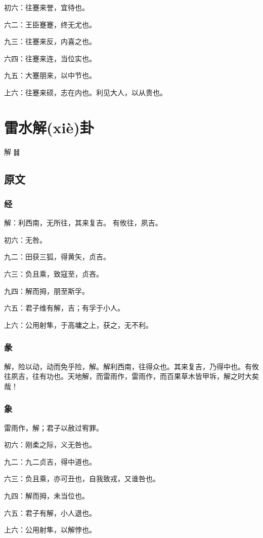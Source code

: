 \documentclass[12pt,oneside]{book}
\begin{document}
初六：往蹇来誉，宜待也。

六二：王臣蹇蹇，终无尤也。

九三：往蹇来反，内喜之也。

六四：往蹇来连，当位实也。

九五：大蹇朋来，以中节也。

上六：往蹇来硕，志在内也。利见大人，以从贵也。

\chapter{雷水解(xiè)卦}
解 {\Large ䷧}

\section{原文}

\subsection{经}
解：利西南，无所往，其来复吉。 有攸往，夙吉。

初六：无咎。

九二：田获三狐，得黄矢，贞吉。

六三：负且乘，致寇至，贞吝。

九四：解而拇，朋至斯孚。

六五：君子维有解，吉；有孚于小人。

上六：公用射隼，于高墉之上，获之，无不利。

\subsection{彖}
解，险以动，动而免乎险，解。解利西南，往得众也。其来复吉，乃得中也。有攸往夙吉，往有功也。天地解，而雷雨作，雷雨作，而百果草木皆甲坼，解之时大矣哉！

\subsection{象}
雷雨作，解；君子以赦过宥罪。

初六：刚柔之际，义无咎也。

九二：九二贞吉，得中道也。

六三：负且乘，亦可丑也，自我致戎，又谁咎也。

九四：解而拇，未当位也。

六五：君子有解，小人退也。

上六：公用射隼，以解悖也。
\end{document}
